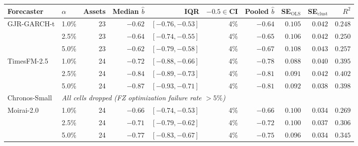 \begin{tabular}{llrrrrrrrr}
\toprule
Forecaster & $\alpha$ & Assets & Median $\hat{b}$ & IQR & $-0.5\in$CI & Pooled $\hat{b}$ & SE$_{\mathrm{OLS}}$ & SE$_{\mathrm{clust}}$ & $R^2$ \\
\midrule
  GJR-GARCH-t & 1.0\% & 23 & $-0.62$ & $[-0.76, -0.53]$ & 4\% & $-0.64$ & $0.105$ & $0.042$ & $0.248$ \\
   & 2.5\% & 23 & $-0.64$ & $[-0.74, -0.55]$ & 4\% & $-0.65$ & $0.106$ & $0.042$ & $0.250$ \\
   & 5.0\% & 23 & $-0.62$ & $[-0.79, -0.58]$ & 4\% & $-0.67$ & $0.108$ & $0.043$ & $0.257$ \\
\addlinespace
  TimesFM-2.5 & 1.0\% & 24 & $-0.72$ & $[-0.88, -0.66]$ & 4\% & $-0.78$ & $0.088$ & $0.040$ & $0.395$ \\
   & 2.5\% & 24 & $-0.84$ & $[-0.89, -0.73]$ & 4\% & $-0.81$ & $0.091$ & $0.042$ & $0.402$ \\
   & 5.0\% & 24 & $-0.87$ & $[-0.93, -0.71]$ & 4\% & $-0.81$ & $0.092$ & $0.038$ & $0.398$ \\
\addlinespace
  Chronos-Small & \multicolumn{9}{l}{\textit{All cells dropped (FZ optimization failure rate $>5\%$)}} \\
\addlinespace
  Moirai-2.0 & 1.0\% & 24 & $-0.66$ & $[-0.74, -0.53]$ & 4\% & $-0.66$ & $0.100$ & $0.034$ & $0.269$ \\
   & 2.5\% & 24 & $-0.71$ & $[-0.79, -0.62]$ & 4\% & $-0.72$ & $0.100$ & $0.037$ & $0.306$ \\
   & 5.0\% & 24 & $-0.77$ & $[-0.83, -0.67]$ & 4\% & $-0.75$ & $0.096$ & $0.034$ & $0.345$ \\
\bottomrule
\end{tabular}
